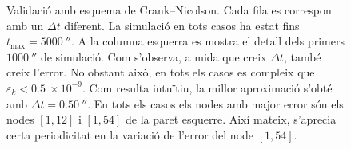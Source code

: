 \begin{figure}[ht]
\begin{subfigure}{.5\textwidth}
		\label{fig:validacio_06}
	\end{subfigure}
	\caption{Validació amb esquema de Crank--Nicolson. Cada fila es correspon amb un $\Delta t$ diferent. La simulació en tots casos ha estat fins $t_\text{max} = 5000 \ \second$. A la columna esquerra es mostra el detall dels primers $1000 \ \second$ de simulació. Com s'observa, a mida que creix $\Delta t$, també creix l'error. No obstant això, en tots els casos es compleix que $\varepsilon_k < 0.5 \ \times 10^{-9}$. Com resulta intuïtiu, la millor aproximació s'obté amb $\Delta t = 0.50 \ \second$. En tots els casos els nodes amb major error són els nodes $[1,12]$ i $[1,54]$ de la paret esquerre. Així mateix, s'aprecia certa periodicitat en la variació de l'error del node $[1,54]$.}
	\label{fig:validacio_crank_nicolson}
\end{figure}



